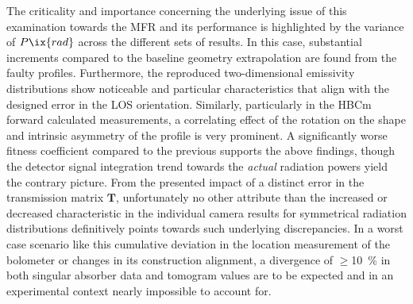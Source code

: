             The criticality and importance concerning the underlying issue of this examination towards the MFR and its performance is highlighted by the variance of $P\ix{rad}$ across the different sets of results. In this case, substantial increments compared to the baseline geometry extrapolation are found from the faulty profiles. Furthermore, the reproduced two-dimensional emissivity distributions show noticeable and particular characteristics that align with the designed error in the LOS orientation. Similarly, particularly in the HBCm forward calculated measurements, a correlating effect of the rotation on the shape and intrinsic asymmetry of the profile is very prominent. A significantly worse fitness coefficient compared to the previous supports the above findings, though the detector signal integration trend towards the \textit{actual} radiation powers yield the contrary picture. From the presented impact of a distinct error in the transmission matrix $\mathbf{T}$, unfortunately no other attribute than the increased or decreased characteristic in the individual camera results for symmetrical radiation distributions definitively points towards such underlying discrepancies. In a worst case scenario like this cumulative deviation in the location measurement of the bolometer or changes in its construction alignment, a divergence of $\ge$\SI{10}{\percent} in both singular absorber data and tomogram values are to be expected and in an experimental context nearly impossible to account for.%
%
